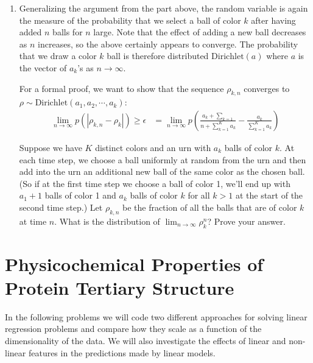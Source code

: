 \documentclass[submit]{harvardml}
\theoremstyle{plain}
\begin{document}
\begin{enumerate}[label=(\alph*)]
\item Generalizing the argument from the part above, the random variable is again the measure of the probability that we select a ball of color $k$ after having added $n$ balls for $n$ large. Note that the effect of adding a new ball decreases as $n$ increases, so the above certainly appears to converge. The probability that we draw a color $k$ ball is therefore distributed $\text{Dirichlet}(a)$ where $a$ is the vector of $a_k$'s as $n \to \infty.$

For a formal proof, we want to show that the sequence $\rho_{k,n}$ converges to $\rho \sim \text{Dirichlet}(a_1,a_2,\cdots,a_k)$:
\begin{align*}
\lim_{n \to \infty} p(|\rho_{k,n} - \rho_k|) \geq \epsilon &= \lim_{n \to \infty} p\left(\frac{a_k + \sum_{k=1}}{n + \sum_{k=1}^K a_k} - \frac{a_k}{\sum_{k=1}^K a_k} \right)
\end{align*}

Suppose we have $K$ distinct colors and an urn with $a_k$ balls of color $k$. At each time step, we choose a ball uniformly at random from the urn and then add into the urn an additional new ball of the same color as the chosen ball. (So if at the first time step we choose a ball of color 1, we'll end up with $a_1+1$ balls of color 1 and $a_k$ balls of color $k$ for all $k > 1$ at the start of the second time step.) Let $\rho_{k,n}$ be the fraction of all the balls that are of color $k$ at time $n$. What is the distribution of $\lim_{n \rightarrow \infty} \rho_k^n$? Prove your answer.
\end{enumerate}

\section*{Physicochemical Properties of Protein Tertiary Structure}

In the following problems we will code two different approaches for
solving linear regression problems and compare how they scale as a function of
the dimensionality of the data.  We will also investigate the effects of
linear and non-linear features in the predictions made by linear models.
\end{document}
